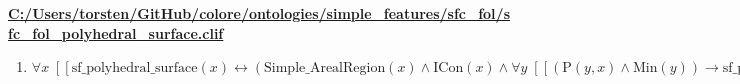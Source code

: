 \documentclass{article}
\begin{document}
\textbf{\url{C:/Users/torsten/GitHub/colore/ontologies/simple\_features/sfc\_fol/sfc\_fol\_polyhedral\_surface.clif}}

\begin{enumerate}
\item $\forall x\;  \left[ \left[ \textrm{sf\_polyhedral\_surface}(x) \leftrightarrow \left(\textrm{Simple\_ArealRegion}(x) \land \textrm{ICon}(x) \land \forall y\;  \left[ \left[ \left(\textrm{P}(y,x) \land \textrm{Min}(y)\right) \rightarrow \textrm{sf\_polygon}(y) \right] \right]\right) \right] \right]$
\end{enumerate}
\end{document}
